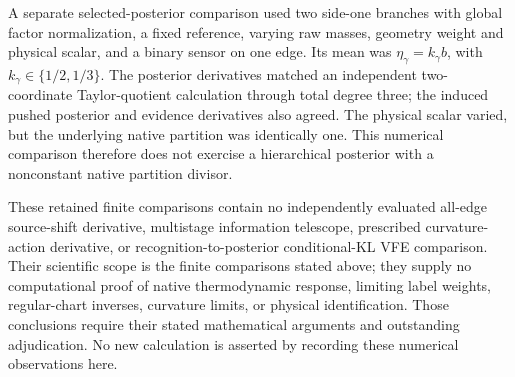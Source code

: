 A separate selected-posterior comparison used two side-one branches with
global factor normalization, a fixed reference, varying raw masses,
geometry weight and physical scalar, and a binary sensor on one edge.
Its mean was $\eta_\gamma=k_\gamma b$, with
$k_\gamma\in\{1/2,1/3\}$. The posterior derivatives matched an independent
two-coordinate Taylor-quotient calculation through total degree three;
the induced pushed posterior and evidence derivatives also agreed.
The physical scalar varied, but the underlying native partition was
identically one. This numerical comparison therefore does not exercise a
hierarchical posterior with a nonconstant native partition divisor.

These retained finite comparisons contain no independently evaluated
all-edge source-shift derivative, multistage information telescope,
prescribed curvature-action derivative, or recognition-to-posterior
conditional-KL VFE comparison. Their scientific scope is the finite
comparisons stated above; they supply no computational proof of native
thermodynamic response, limiting label weights, regular-chart inverses,
curvature limits, or physical identification. Those conclusions require
their stated mathematical arguments and outstanding adjudication.
No new calculation is asserted by recording these numerical observations
here. 
